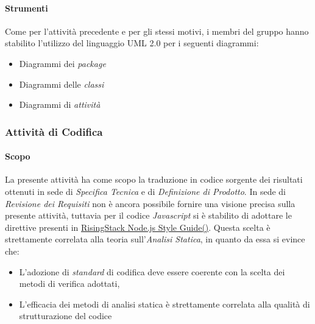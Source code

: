 		 
		        \paragraph*{Strumenti}
		        Come per l'attivit\`a precedente e per gli stessi motivi, i membri del gruppo hanno stabilito l'utilizzo del linguaggio UML 2.0 per i seguenti
		        diagrammi:
		        \begin{itemize}
			\item Diagrammi dei \textit{package}  
			\item Diagrammi delle \textit{classi}	
			\item Diagrammi di \textit{attivit\`a}
		        \end{itemize}
			 
		
		\subsubsection{Attività di Codifica}
                \paragraph*{Scopo}
                La presente attivit\`a ha come scopo la traduzione in codice sorgente dei risultati ottenuti in sede
                di \textit{Specifica Tecnica} e di \textit{Definizione di Prodotto}.
                In sede di \textit{Revisione dei Requisiti} non \`e ancora possibile fornire una visione precisa sulla presente attivit\`a,
                tuttavia per il codice \textit{Javascript} %
                si \`e stabilito di adottare le direttive presenti in \href{https://github.com/RisingStack/node-style-guide/blob/master/README.md}{RisingStack Node.js Style Guide()}.
                Questa scelta \`e strettamente correlata alla teoria sull'\textit{Analisi Statica}, in quanto da essa si evince che:
                \begin{itemize}
		  \item L’adozione di \textit{standard} di codifica 
                    deve essere coerente con la scelta dei metodi di verifica adottati,         
		  \item L’efficacia dei metodi di analisi statica \`e strettamente correlata alla qualit\`a di strutturazione del codice
                \end{itemize}
                
